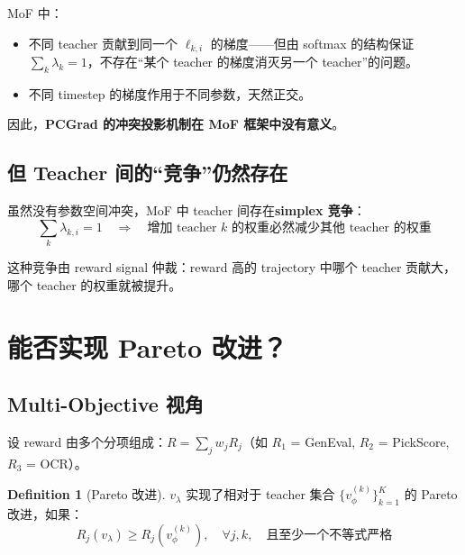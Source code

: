 \documentclass[11pt,a4paper]{article}
\newcommand{\vphi}{v_\phi}
\theoremstyle{definition}
\newtheorem{definition}{Definition}
\begin{document}
MoF 中：
\begin{itemize}
\item 不同 teacher 贡献到同一个 $\ell_{k,i}$ 的梯度——但由 softmax 的结构保证 $\sum_k \lambda_k = 1$，不存在``某个 teacher 的梯度消灭另一个 teacher''的问题。
\item 不同 timestep 的梯度作用于不同参数，天然正交。
\end{itemize}

因此，\textbf{PCGrad 的冲突投影机制在 MoF 框架中没有意义}。

\subsection{但 Teacher 间的``竞争''仍然存在}

虽然没有参数空间冲突，MoF 中 teacher 间存在\textbf{simplex 竞争}：
\begin{equation}
\sum_k \lambda_{k,i} = 1 \quad\Rightarrow\quad \text{增加 teacher $k$ 的权重必然减少其他 teacher 的权重}
\end{equation}

这种竞争由 reward signal 仲裁：reward 高的 trajectory 中哪个 teacher 贡献大，哪个 teacher 的权重就被提升。

\section{能否实现 Pareto 改进？}
\label{sec:pareto}

\subsection{Multi-Objective 视角}

设 reward 由多个分项组成：$R = \sum_j w_j R_j$（如 $R_1$ = GenEval, $R_2$ = PickScore, $R_3$ = OCR）。

\begin{definition}[Pareto 改进]
$v_\lambda$ 实现了相对于 teacher 集合 $\{\vphi^{(k)}\}_{k=1}^K$ 的 Pareto 改进，如果：
\begin{equation}
R_j(v_\lambda) \geq R_j(\vphi^{(k)}), \quad \forall j, k, \quad\text{且至少一个不等式严格}
\end{equation}
\end{definition}
\end{document}
